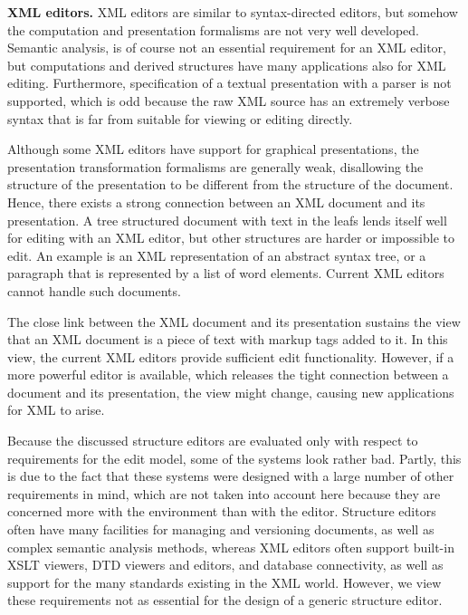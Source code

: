 {\bf XML editors.} XML editors are similar to syntax-directed editors, but somehow the computation and presentation formalisms are not very well developed. Semantic analysis, is of course not an essential requirement for an XML editor, but computations and derived structures have many applications also for XML editing. Furthermore, specification of a textual presentation with a parser is not supported, which is odd because the raw XML source has an extremely verbose syntax that is far from suitable for viewing or editing directly.

Although some XML editors have support for graphical presentations, the presentation transformation formalisms are generally weak, disallowing the structure of the presentation to be different from the structure of the document. Hence, there exists a strong connection between an XML document and its presentation. A tree structured document with text in the leafs lends itself well for editing with an XML editor, but other structures are harder or impossible to edit. An example is an XML representation of an abstract syntax tree, or a paragraph that is represented by a list of word elements. Current XML editors cannot handle such documents.

The close link between the XML document and its presentation sustains the view that an XML document is a piece of text with markup tags added to it. In this view, the current XML editors provide sufficient edit functionality. However, if a more powerful editor is available, which releases the tight connection between a document and its presentation, the view might change, causing new applications for XML to arise.


\bigskip

Because the discussed structure editors are evaluated only with respect to requirements for the edit model, some of the systems look rather bad. Partly, this is due to the fact that these systems were designed with a large number of other requirements in mind, which are not taken into account here because they are concerned more with the environment than with the editor. Structure editors often have many facilities for managing and versioning documents, as well as complex semantic analysis methods, whereas XML editors often support built-in XSLT viewers, DTD viewers and editors, and database connectivity, as well as support for the many standards existing in the XML world. However, we view these requirements not as essential for the design of a generic structure editor.

